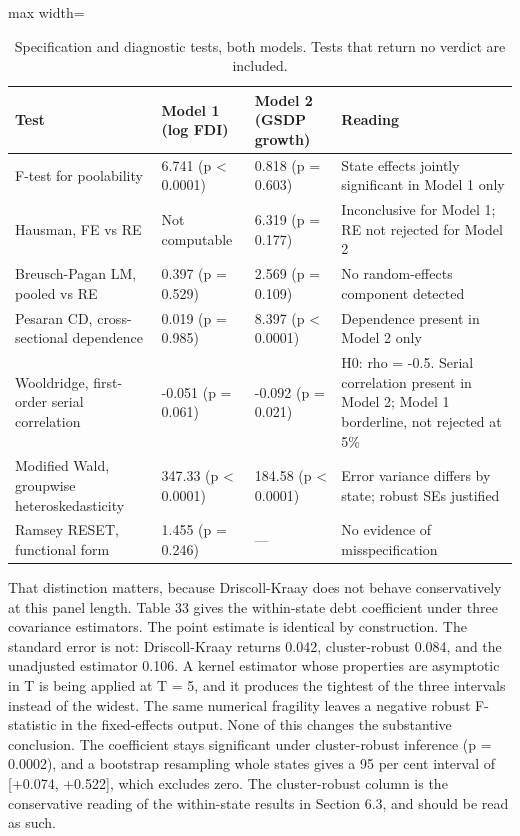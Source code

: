 \documentclass[12pt,a4paper]{article}
\begin{document}
\begin{table}[H]
\centering
\caption{Specification and diagnostic tests, both models. Tests that return no verdict are included.}
\label{tab:32}
\footnotesize
\begin{adjustbox}{max width=\textwidth}
\begin{tabular}{@{}llll@{}}
\toprule
Test & Model 1 (log FDI) & Model 2 (GSDP growth) & Reading \\
\midrule
F-test for poolability & 6.741 (p < 0.0001) & 0.818 (p = 0.603) & State effects jointly significant in Model 1 only \\
Hausman, FE vs RE & Not computable & 6.319 (p = 0.177) & Inconclusive for Model 1; RE not rejected for Model 2 \\
Breusch-Pagan LM, pooled vs RE & 0.397 (p = 0.529) & 2.569 (p = 0.109) & No random-effects component detected \\
Pesaran CD, cross-sectional dependence & 0.019 (p = 0.985) & 8.397 (p < 0.0001) & Dependence present in Model 2 only \\
Wooldridge, first-order serial correlation & -0.051 (p = 0.061) & -0.092 (p = 0.021) & H0: rho = -0.5. Serial correlation present in Model 2; Model 1 borderline, not rejected at 5\% \\
Modified Wald, groupwise heteroskedasticity & 347.33 (p < 0.0001) & 184.58 (p < 0.0001) & Error variance differs by state; robust SEs justified \\
Ramsey RESET, functional form & 1.455 (p = 0.246) & --- & No evidence of misspecification \\
\bottomrule
\end{tabular}
\end{adjustbox}
\end{table}

That distinction matters, because Driscoll-Kraay does not behave conservatively at this panel length. Table 33 gives the within-state debt coefficient under three covariance estimators. The point estimate is identical by construction. The standard error is not: Driscoll-Kraay returns 0.042, cluster-robust 0.084, and the unadjusted estimator 0.106. A kernel estimator whose properties are asymptotic in T is being applied at T = 5, and it produces the tightest of the three intervals instead of the widest. The same numerical fragility leaves a negative robust F-statistic in the fixed-effects output. None of this changes the substantive conclusion. The coefficient stays significant under cluster-robust inference (p = 0.0002), and a bootstrap resampling whole states gives a 95 per cent interval of [+0.074, +0.522], which excludes zero. The cluster-robust column is the conservative reading of the within-state results in Section 6.3, and should be read as such.
\end{document}
